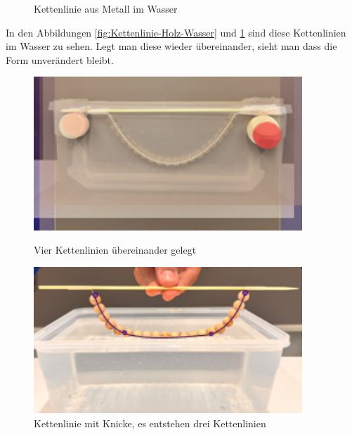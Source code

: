 \begin{figure}
\begin{minipage}{0.45\textwidth}
		\caption{Kettenlinie aus Metall im Wasser}
		\label{fig:Kettenlinie-Metall-Wasser}
	\end{minipage}
\end{figure}

In den Abbildungen \ref{fig:Kettenlinie-Holz-Wasser} und \ref{fig:Kettenlinie-Metall-Wasser} sind diese Kettenlinien im Wasser zu sehen.
Legt man diese wieder übereinander, sieht man dass die Form unverändert bleibt.

\begin{figure}
	\centering
	\begin{minipage}{0.45\textwidth}
		\centering
		\includegraphics[width=0.9\textwidth]{papers/kettenlinie/images/kettenlinie_merged.png}
		\caption{Vier Kettenlinien übereinander gelegt}
		\label{fig:Kettenlinie-Merged}
	\end{minipage}\hfill
	\begin{minipage}{0.45\textwidth}
		\centering
		\includegraphics[width=0.9\textwidth]{papers/kettenlinie/images/kettenlinie_curves.png}
		\caption{Kettenlinie mit Knicke, es entstehen drei Kettenlinien}
		\label{fig:Kettenlinie-Curves}
	\end{minipage}
\end{figure}


